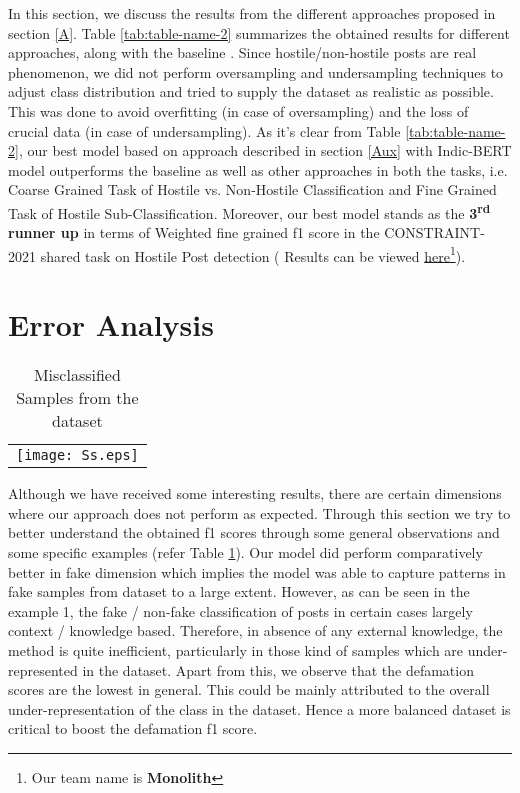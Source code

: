 \documentclass[runningheads]{llncs}
\begin{document}
In this section, we discuss the results from the different approaches proposed in section \ref{A}. Table \ref{tab:table-name-2} summarizes the obtained results for different approaches, along with the baseline \cite{bhardwaj2020hostility}. Since hostile/non-hostile posts are real phenomenon, we did not perform oversampling and undersampling techniques to adjust class distribution and tried to supply the dataset as realistic as possible. This was done to avoid overfitting (in case of oversampling) and the loss of crucial data (in case of undersampling). As it's clear from Table \ref{tab:table-name-2}, our best model based on approach described in section \ref{Aux} with Indic-BERT model outperforms the baseline as well as other approaches in both the tasks, i.e. Coarse Grained Task of Hostile vs. Non-Hostile Classification and Fine Grained Task of Hostile Sub-Classification. Moreover, our best model stands as the \textbf{3\textsuperscript{rd} runner up} in terms of Weighted fine grained f1 score in the CONSTRAINT-2021 shared task on Hostile Post detection ( Results can be viewed \href{https://drive.google.com/file/d/1KYi4A\_QgmGRgEsxylCoLI2ddO872hMaf/view}{here}\footnote{Our team name is \textbf{Monolith}}). 

\section{Error Analysis}
\begin{table}[b!]
\caption{\label{tab:table-name} Misclassified Samples from the dataset}
\begin{tabularx}{\textwidth}{c}
\begin{minipage}{1.0\textwidth}
      \texttt{[image: Ss.eps]}
    \end{minipage}
\end{tabularx}
\end{table}
Although we have received some interesting results, there are certain dimensions where our approach does not perform as expected. Through this section we try to better understand the obtained f1 scores through some general observations and some specific examples (refer Table \ref{tab:table-name}). Our model did perform comparatively better in fake dimension which implies the model was able to capture patterns in fake samples from dataset to a large extent. However, as can be seen in the example 1, the fake / non-fake classification of posts in certain cases largely context / knowledge based. Therefore, in absence of any external knowledge, the method is quite inefficient, particularly in those kind of samples which are under-represented in the dataset. Apart from this, we observe that the defamation scores are the lowest in general. This could be mainly attributed to the overall under-representation of the class in the dataset. Hence a more balanced dataset is critical to boost the defamation f1 score. \\
\end{document}
